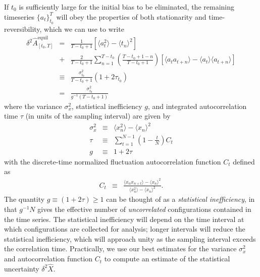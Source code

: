\documentclass[aps,pre,twocolumn,nofootinbib,superscriptaddress,linenumbers,11point]{revtex4-1}
\newcommand{\expect}[1]{\langle #1 \rangle}                %
\newcommand{\estimator}[1]{\hat{#1}}                       %
\begin{document}
If $t_0$ is sufficiently large for the initial bias to be eliminated, the remaining timeseries $\{a_t\}_{t_0}^T$ will obey the properties of both stationarity and time-reversibility, which we can use to write
\begin{eqnarray}
\delta^2 \hat{A}_{[t_0,T]}^\mathrm{equil} &=& \frac{1}{T-t_0+1} \left[ \expect{a_t^2} - \expect{t_n}^2 \right] \nonumber \\
\mbox{} &+& \frac{2}{T-t_0+1} \sum_{n=1}^{T-t_0} \left(\frac{T-t_0+1-n}{T-t_0+1}\right) \left[ \expect{a_t a_{t+n}} - \expect{a_t}\expect{a_{t+n}} \right]  \nonumber \\
&\equiv& \frac{\sigma_{t_0}^2}{T-t_0+1}(1 + 2 \tau_{t_0}) \nonumber \\
&=& \frac{\sigma_{t_0}^2}{g^{-1} (T-t_0+1)}
\end{eqnarray}
where the variance $\sigma_x^2$, statistical inefficiency $g$, and integrated autocorrelation time $\tau$ (in units of the sampling interval) are given by
\begin{eqnarray}
\sigma_x^2 &\equiv& \expect{x_n^2} - \expect{x_n}^2 \label{equation:variance-definition} \\
\tau &\equiv& \sum_{t=1}^{N-1} \left(1 - \frac{t}{N}\right) C_t \label{equation:integrated-autocorrelation-time-definition} \\
g &\equiv& 1 + 2 \tau \label{equation:statistical-inefficiency-definition}
\end{eqnarray}
with the discrete-time normalized fluctuation autocorrelation function $C_t$ defined as
\begin{eqnarray}
C_t &\equiv& \frac{\expect{x_n x_{n+t}} - \expect{x_n}^2}{\expect{x_n^2} - \expect{x_n}^2} . \label{equation:autocorrelation-definition}
\end{eqnarray}
The quantity $g \equiv (1 + 2 \tau) \ge 1$ can be thought of as a \emph{statistical inefficiency}, in that $g^{-1} N$ gives the effective number of \emph{uncorrelated} configurations contained in the time series.  The statistical inefficiency will depend on the time interval at which configurations are collected for analysis; longer intervals will reduce the statistical inefficiency, which will approach unity as the sampling interval exceeds the correlation time. Practically, we use our best estimates for the variance $\sigma_x^2$ and autocorrelation function $C_t$ to compute an estimate of the statistical uncertainty $\delta^2 \estimator{X}$.

\end{document}
